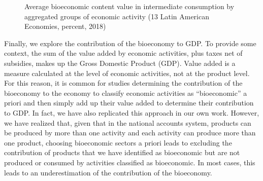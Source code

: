 \documentclass[
  letterpaper,
  DIV=11,
  numbers=noendperiod]{scrartcl}
\begin{document}
\begin{figure}


\caption{\label{fig-latam-avg-sector-biocontent}Average bioeconomic
content value in intermediate consumption by aggregated groups of
economic activity (13 Latin American Economies, percent, 2018)}

\end{figure}%

Finally, we explore the contribution of the bioeconomy to GDP. To
provide some context, the sum of the value added by economic activities,
plus taxes net of subsidies, makes up the Gross Domestic Product (GDP).
Value added is a measure calculated at the level of economic activities,
not at the product level. For this reason, it is common for studies
determining the contribution of the bioeconomy to the economy to
classify economic activities as ``bioeconomic'' a priori and then simply
add up their value added to determine their contribution to GDP. In
fact, we have also replicated this approach in our own work. However, we
have realized that, given that in the national accounts system, products
can be produced by more than one activity and each activity can produce
more than one product, choosing bioeconomic sectors a priori leads to
excluding the contribution of products that we have identified as
bioeconomic but are not produced or consumed by activities classified as
bioeconomic. In most cases, this leads to an underestimation of the
contribution of the bioeconomy.
\end{document}
